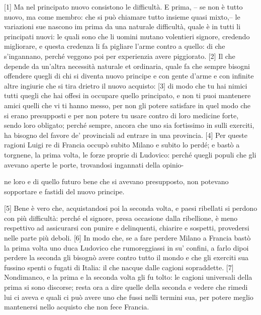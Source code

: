 
{[}1{]} Ma nel principato nuovo consistono le difficultà. E prima, -- se
non è tutto nuovo, ma come membro: che si può chiamare tutto insieme
quasi mixto,-- le variazioni sue nascono im prima da una naturale
difficultà, quale è in tutti li principati nuovi: le quali sono che li
uomini mutano volentieri signore, credendo migliorare, e questa credenza
li fa pigliare l'arme contro a quello: di che s'ingannano, perché
veggono poi per experienzia avere piggiorato. {[}2{]} Il che depende da
un'altra necessità naturale et ordinaria, quale fa che sempre bisogni
offendere quegli di chi si diventa nuovo principe e con gente d'arme e
con infinite altre ingiurie che si tira drietro il nuovo acquisto:
{[}3{]} di modo che tu hai nimici tutti quegli che hai offesi in
occupare quello principato, e non ti puoi mantenere amici quelli che vi
ti hanno messo, per non gli potere satisfare in quel modo che si erano
presupposti e per non potere tu usare contro di loro medicine forte,
sendo loro obligato; perché sempre, ancora che uno sia fortissimo in
sulli exerciti, ha bisogno del favore de' provinciali ad entrare in una
provincia. {[}4{]} Per queste ragioni Luigi  re di Francia occupò
subito Milano e subito lo perdé; e bastò a torgnene, la prima volta, le
forze proprie di Ludovico: perché quegli populi che gli avevano aperte
le porte, trovandosi ingannati della opinio-

\pagebreak

\noindent{}ne loro e di quello futuro
bene che si avevano presupposto, non potevano sopportare e fastidi del
nuovo principe.

{[}5{]} Bene è vero che, acquistandosi poi la seconda volta, e paesi
ribellati si perdono con più difficultà: perché el signore, presa
occasione dalla ribellione, è meno respettivo ad assicurarsi con punire
e delinquenti, chiarire e sospetti, provedersi nelle parte più deboli.
{[}6{]} In modo che, se a fare perdere Milano a Francia bastò la prima
volta uno duca Ludovico che rumoreggiassi in su' confini, a farlo dipoi
perdere la seconda gli bisognò avere contro tutto il mondo e che gli
exerciti sua fussino spenti o fugati di Italia: il che nacque dalle
cagioni sopraddette. {[}7{]} Nondimanco, e la prima e la seconda volta
gli fu tolto: le cagioni universali della prima si sono discorse; resta
ora a dire quelle della seconda e vedere che rimedi lui ci aveva e quali
ci può avere uno che fussi nelli termini sua, per potere meglio
mantenersi nello acquisto che non fece Francia.

